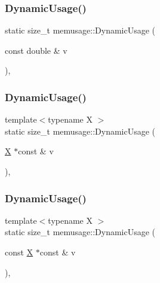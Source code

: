 \mbox{\label{namespacememusage_a17336b4c23b938ac4a7bbd2d130a0bc3}} 
\subsubsection{\texorpdfstring{Dynamic\+Usage()}{DynamicUsage()}\hspace{0.1cm}{\footnotesize\ttfamily [10/18]}}
{\footnotesize\ttfamily static size\+\_\+t memusage\+::\+Dynamic\+Usage (\begin{DoxyParamCaption}\item[{const double \&}]{v }\end{DoxyParamCaption})\hspace{0.3cm}{\ttfamily [inline]}, {\ttfamily [static]}}

\mbox{\label{namespacememusage_a395d10b121d3d86b2211a46f017ca304}} 
\subsubsection{\texorpdfstring{Dynamic\+Usage()}{DynamicUsage()}\hspace{0.1cm}{\footnotesize\ttfamily [11/18]}}
{\footnotesize\ttfamily template$<$typename X $>$ \\
static size\+\_\+t memusage\+::\+Dynamic\+Usage (\begin{DoxyParamCaption}\item[{\mbox{\hyperlink{net_8cpp_a826edd40636cbaa44266b97c8c6a4fa3}{X}} $\ast$const \&}]{v }\end{DoxyParamCaption})\hspace{0.3cm}{\ttfamily [inline]}, {\ttfamily [static]}}

\mbox{\label{namespacememusage_ad9b1d01b0cba84932757c4fc1e35a267}} 
\subsubsection{\texorpdfstring{Dynamic\+Usage()}{DynamicUsage()}\hspace{0.1cm}{\footnotesize\ttfamily [12/18]}}
{\footnotesize\ttfamily template$<$typename X $>$ \\
static size\+\_\+t memusage\+::\+Dynamic\+Usage (\begin{DoxyParamCaption}\item[{const \mbox{\hyperlink{net_8cpp_a826edd40636cbaa44266b97c8c6a4fa3}{X}} $\ast$const \&}]{v }\end{DoxyParamCaption})\hspace{0.3cm}{\ttfamily [inline]}, {\ttfamily [static]}}

